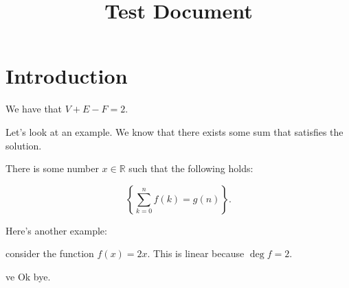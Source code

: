 \documentclass{pranav2}
\title{Test Document}
\begin{document}
 
 \maketitle 

\section{Introduction}

\begin{theorem}{}{}
We have that $V + E - F = 2$.
\end{theorem}

Let's look at an example. We know that there exists some sum that satisfies the solution.

There is some number $x \in \mathbb{R}$ such that the following holds:

\[ \left \{ \sum_{k=0}^n f\left (k\right ) = g\left (n\right ) \right \}. \]

Here's another example:
\begin{example}{}{}
consider the function $f(x) = 2x$. This is linear because $\deg{f} = 2$.
\end{example}
ve
Ok bye.
\end{document}

